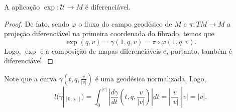 \begin{proposition}
    \label{prop:exp-diferenciavel}
    A aplicação $\exp:\mathcal{U}\to M$ é diferenciável.
    \begin{proof}

        De fato, sendo $\varphi$ o fluxo do campo geodésico de $M$ e $\pi:TM\to M$ a projeção diferenciável na primeira coordenada do fibrado, temos que
        \begin{equation*}
            \exp(q,v)=\gamma(1,q,v)=\pi \circ \varphi(1,q,v).
        \end{equation*}
        Logo, $\exp$ é a composição de mapas diferenciáveis e, portanto, também é diferenciável.
    \end{proof}
\end{proposition}
Note que a curva $\gamma\left( t,q, \frac{v}{|v|} \right)$ é uma geodésica normalizada. Logo,
\begin{equation*}
    l(\gamma|_{[0,|v|]})=\int_{0}^{|v|}\left|\frac{d\gamma}{dt}\left( t,q,\frac{v}{|v|} \right)\right|dt=\left|\frac{v}{|v|}\right| |v|=|v|.
\end{equation*}
